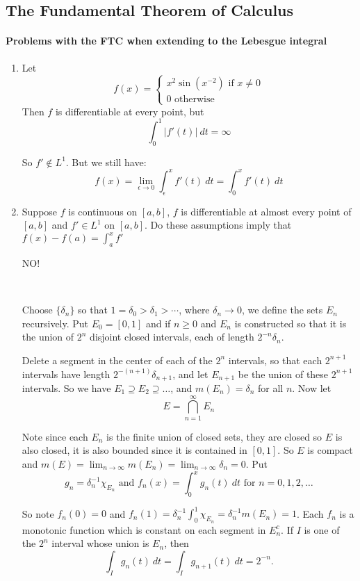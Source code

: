 \subsection{The Fundamental Theorem of Calculus}
\paragraph*{Problems with the FTC when extending to the Lebesgue integral}
\begin{enumerate}[label = (\alph*)]
\item Let \[
    f(x) = \begin{cases}
        x^2\sin(x^{-2}) \text{ if }x\neq 0\\
        0 \text{ otherwise}
    \end{cases}    
\]
Then $f$ is differentiable at every point, but\[
    \int_0^1 |f'(t)|~dt =\infty    
\]

So $f'\not\in L^1$. But we still have:\[
    f(x) = \lim_{\epsilon\rightarrow 0}\int_\epsilon^x f'(t)~dt = \int_0^x f'(t)~dt    
\]

\item Suppose $f$ is continuous on $[a,b]$, $f$ is differentiable at almost every point of $[a,b]$ and $f'\in L^1$ on $[a,b]$. Do these assumptions imply that $f(x) - f(a) = \int_a^x f'$

\textsc{NO!}

\

Choose $\{\delta_n\}$ so that $1 = \delta_0>\delta_1>\cdots$, where $\delta_n\rightarrow 0$, we define the sets $E_n$ recursively. Put $E_0 = [0,1]$ and if $n\geq 0$ and $E_n$ is constructed so that it is the union of $2^n$ disjoint closed intervals, each of length $2^{-n}\delta_n$. 

Delete a segment in the center of each of the $2^n$ intervals, so that each $2^{n+1}$ intervals have length $2^{-(n+1)}\delta_{n+1}$, and let $E_{n+1}$ be the union of these $2^{n+1}$ intervals. So we have $E_1\supseteq E_2\supseteq \ldots$, and $m(E_n) = \delta_n$ for all $n$. Now let\[
    E = \bigcap_{n=1}^\infty E_n    
\]

Note since each $E_n$ is the finite union of closed sets, they are closed so $E$ is also closed, it is also bounded since it is contained in $[0,1]$. So $E$ is compact and $m(E) = \lim_{n\rightarrow \infty}m(E_n) = \lim_{n\rightarrow \infty}\delta_n = 0$. Put \[
    g_n = \delta_n^{-1}\chi_{E_n} \text{ and } f_n(x) = \int_0^x g_n(t)~dt \text{ for }n=0,1,2,\ldots    
\]

So note $f_n(0) = 0$ and $f_n(1) = \delta_n^{-1}\int_0^1 \chi_{E_n} = \delta_n^{-1}m(E_n) = 1$. Each $f_n$ is a monotonic function which is constant on each segment in $E_n^c$.
If $I$ is one of the $2^n$ interval whose union is $E_n$, then\[
    \int_I g_n(t)~dt = \int_I g_{n+1}(t)~dt = 2^{-n}.    
\]


\end{enumerate}
